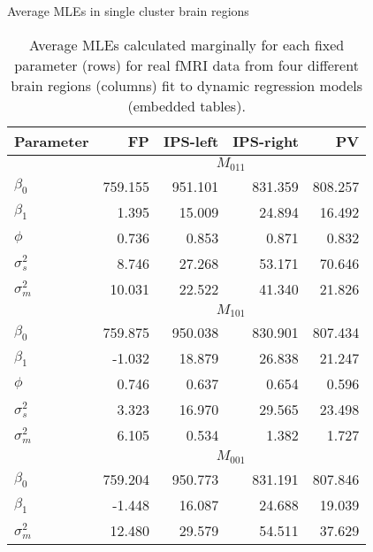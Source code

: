 %

\begin{table}
\ssp
\centering
\caption{Average MLEs in single cluster brain regions} \label{tab:fmri:mle:means}
\begin{tabular}{|l|rrrr|}
\hline
Parameter & FP & IPS-left & IPS-right & PV \\
\hline
 & \multicolumn{4}{|c|}{$M_{011}$} \\
\hline
$\beta_0$ & 759.155 & 951.101 & 831.359 & 808.257 \\
$\beta_1$ & 1.395 & 15.009 & 24.894 & 16.492 \\
$\phi$ & 0.736 & 0.853 & 0.871 & 0.832 \\
$\sigma^2_s$ & 8.746 & 27.268 & 53.171 & 70.646 \\
$\sigma^2_m$ & 10.031 & 22.522 & 41.340 & 21.826 \\
\hline
 & \multicolumn{4}{|c|}{$M_{101}$} \\
\hline
$\beta_0$ & 759.875 & 950.038 & 830.901 & 807.434 \\
$\beta_1$ & -1.032 & 18.879 & 26.838 & 21.247 \\
$\phi$ & 0.746 & 0.637 & 0.654 & 0.596 \\
$\sigma^2_s$ & 3.323 & 16.970 & 29.565 & 23.498 \\
$\sigma^2_m$ & 6.105 & 0.534 & 1.382 & 1.727 \\
\hline
 & \multicolumn{4}{|c|}{$M_{001}$} \\
\hline
$\beta_0$ & 759.204 & 950.773 & 831.191 & 807.846 \\
$\beta_1$ & -1.448 & 16.087 & 24.688 & 19.039 \\
$\sigma^2_m$ & 12.480 & 29.579 & 54.511 & 37.629 \\
\hline
\end{tabular}
\caption*{Average MLEs calculated marginally for each fixed parameter (rows) for real fMRI data from four different brain regions (columns) fit to dynamic regression models (embedded tables).}
\end{table}

